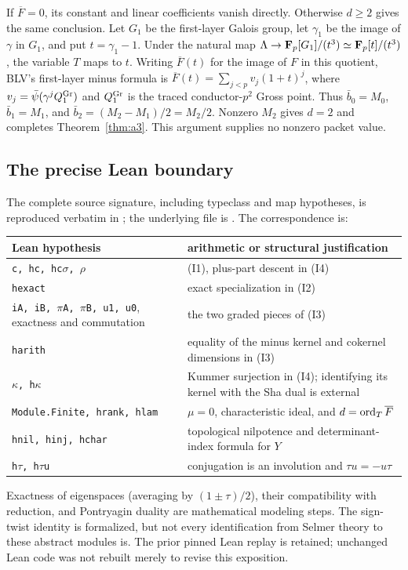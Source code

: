 If $\overline F=0$, its constant and linear coefficients vanish directly. Otherwise $d\ge2$ gives the same conclusion. Let $G_1$ be the first-layer Galois group, let $\gamma_1$ be the image of $\gamma$ in $G_1$, and put $t=\gamma_1-1$. Under the natural map
$\Lambda\to\mathbf{F}_p[G_1]/(t^3)\simeq\mathbf{F}_p[t]/(t^3)$, the variable $T$ maps to $t$.
Writing $\overline F(t)$ for the image of $F$ in this quotient, BLV's first-layer minus formula is
$\overline F(t)=\sum_{j<p}v_j(1+t)^j$, where
$v_j=\bar\psi(\gamma^jQ^{\rm Gr}_1)$ and $Q^{\rm Gr}_1$ is the traced conductor-$p^2$ Gross point. Thus
$\bar b_0=M_0$, $\bar b_1=M_1$, and $\bar b_2=(M_2-M_1)/2=M_2/2$.
Nonzero $M_2$ gives $d=2$ and completes Theorem~\ref{thm:a3}. This argument supplies no nonzero packet value.

\subsection{The precise Lean boundary}
The complete source signature, including typeclass and map hypotheses, is reproduced verbatim in
; the underlying file is
.
The correspondence is:
\begin{center}\begin{tabular}{@{}p{}p{}@{}}\toprule
Lean hypothesis & arithmetic or structural justification\\\midrule
\texttt{c, hc, hc$\sigma$, $\rho$} & (I1), plus-part descent in (I4)\\
\texttt{hexact} & exact specialization in (I2)\\
\texttt{iA, iB, $\pi$A, $\pi$B, u1, u0}, exactness and commutation & the two graded pieces of (I3)\\
\texttt{harith} & equality of the minus kernel and cokernel dimensions in (I3)\\
\texttt{$\kappa$, h$\kappa$} & Kummer surjection in (I4); identifying its kernel with the Sha dual is external\\
\texttt{Module.Finite, hrank, hlam} & $\mu=0$, characteristic ideal, and $d=\operatorname{ord}_T\overline F$\\
\texttt{hnil, hinj, hchar} & topological nilpotence and determinant-index formula for $Y$\\
\texttt{h$\tau$, h$\tau$u} & conjugation is an involution and $\tau u=-u\tau$\\\bottomrule
\end{tabular}\end{center}
Exactness of eigenspaces (averaging by $(1\pm\tau)/2$), their compatibility with reduction, and Pontryagin duality are mathematical modeling steps. The sign-twist identity is formalized, but not every identification from Selmer theory to these abstract modules is. The prior pinned Lean replay is retained; unchanged Lean code was not rebuilt merely to revise this exposition.
